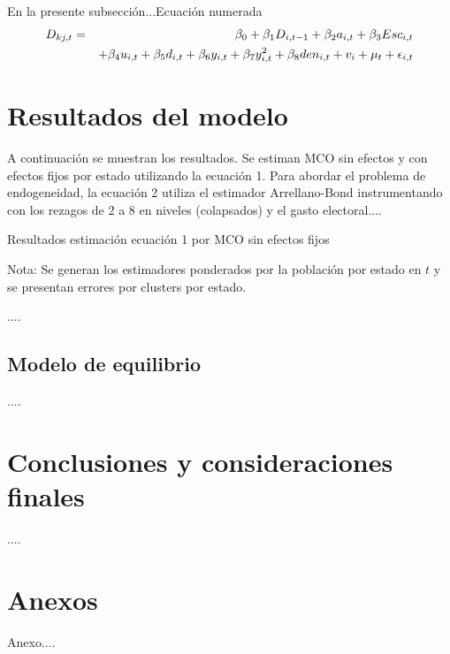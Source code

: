 \documentclass[11pt]{article}
\begin{document}
En la presente subsección...Ecuación numerada
%
\begin{eqnarray}
D_{kj,t} &=&\beta_0 + \beta_1 D_{i,t-1} + \beta_2 a_{i,t} + \beta_3 Esc_{i,t}  \notag \\
 &&+ \beta_4 u_{i,t}  + \beta_5 d_{i,t}   + \beta_6 y_{i,t}  + \beta_7 y^2_{i,t}  + \beta_8 den_{i,t}  + v_{i} +  \mu_t  +\epsilon_{i,t} 
\end{eqnarray}
%
\section{Resultados del modelo}

A continuación se muestran los resultados. Se estiman MCO sin efectos y con efectos fijos por estado utilizando la ecuación 1. Para abordar el problema de endogeneidad, la ecuación 2 utiliza el estimador Arrellano-Bond instrumentando con los rezagos de 2 a 8 en niveles (colapsados) y el gasto electoral....


\begin{table}[H]
\begin{center}
\caption{Resultados estimación ecuación 1 por MCO sin efectos fijos}
\resizebox{6.5in}{!}{
}
\end{center}
\begin{tiny}
Nota: Se generan los estimadores ponderados por la población por estado en $t$ y se presentan errores por clusters por estado.
\end{tiny}
\end{table}

....


\subsection{Modelo de equilibrio}

....

\section{Conclusiones y consideraciones finales}

....





\pagebreak

\renewcommand{\refname}{Bibliografía}





\newpage


\newpage
{}
\appendix    

\section*{Anexos} 
Anexo....
\end{document}
